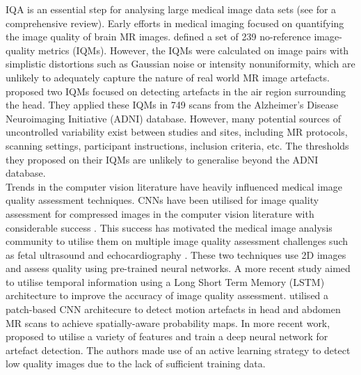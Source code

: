 \documentclass[preprint,12pt,authoryear]{elsarticle}
\begin{document}
IQA is an essential step for analysing large medical image data sets (see \cite{Chow2016} for a comprehensive review). Early efforts in medical imaging focused on quantifying the image quality of brain MR images. \cite{Woodard2006} defined a set of 239 no-reference image-quality metrics (IQMs). However, the IQMs were calculated on image pairs with simplistic distortions such as Gaussian  noise  or  intensity  nonuniformity, which are unlikely to adequately capture the nature of real world MR image artefacts. \cite{Mortamet2009}  proposed two IQMs focused on detecting artefacts in the air region surrounding the head. They applied these IQMs in 749 scans from the Alzheimer’s Disease Neuroimaging Initiative (ADNI) database. However, many potential sources of uncontrolled variability exist between studies and sites, including MR protocols, scanning settings, participant instructions, inclusion criteria, etc. The thresholds they proposed on their IQMs are unlikely to generalise beyond the ADNI database.\\

Trends in the computer vision literature have heavily influenced medical image quality assessment techniques.
CNNs have been utilised for image quality assessment for compressed images in the computer vision literature with considerable success \citep{Kang2014}. This success has motivated the medical image analysis community to utilise them on multiple image quality assessment challenges such as fetal ultrasound \citep{Wu2017} and echocardiography \citep{Abdi2017}. These two techniques use 2D images and assess quality using pre-trained neural networks. A more recent study \citep{Abdi2017a} aimed to utilise temporal information using a Long Short Term Memory (LSTM) architecture to improve the accuracy of image quality assessment. \cite{Kuestner2018a} utilised a patch-based CNN architecure to detect motion artefacts in head and abdomen MR scans to achieve spatially-aware probability maps. In more recent work, \cite{Kuestner2018} proposed to utilise a variety of features and train a deep neural network for artefact detection. The authors made use of an active learning strategy to detect low quality images due to the lack of sufficient training data.\\
\end{document}
